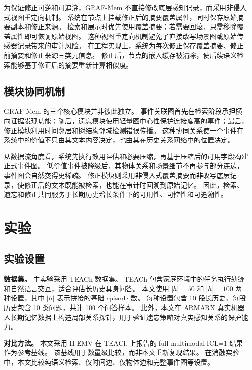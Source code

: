 \documentclass{cjc}
\begin{document}
为保证修正可逆和可追溯，GRAF-Mem 不直接修改底层感知记录，而采用非侵入式视图重定向机制。
系统在节点上挂载修正后的摘要覆盖属性，同时保存原始摘要副本和修正来源。
检索和展示时优先使用覆盖摘要；若需要回滚，只需移除覆盖属性即可恢复原始视图。
这种视图重定向机制避免了直接改写场景图或原始传感器记录带来的审计风险。
在工程实现上，系统为每次修正保存覆盖摘要、修正前摘要和修正来源三类元信息。
修正后，节点的嵌入缓存被清除，使后续语义检索能够基于修正后的摘要重新计算相似度。

\subsection{模块协同机制}

GRAF-Mem 的三个核心模块并非彼此独立。
事件关联图首先在检索阶段承担横向证据发现功能；随后，遗忘模块使用轻量图中心性保护连接度高的事件；最后，修正模块利用时间邻居和树结构邻域检测错误传播。
这种协同关系使一个事件在系统中的价值不只由其文本内容决定，也由其在历史关系网络中的位置决定。

从数据流角度看，系统先执行效用评估和必要压缩，再基于压缩后的可用字段构建正式事件图。
低价值事件被降级后，其物体关系和场景细节不再参与部分连边，事件图会自然变得更稀疏。
修正模块则采用非侵入式覆盖摘要而非改写底层记录，使修正后的文本既能被检索，也能在审计时回溯到原始记忆。
因此，检索、遗忘和修正共同服务于长期历史增长条件下的可用性、可控性和可追溯性。

\section{实验}

\subsection{实验设置}

\textbf{数据集。}
主实验采用 TEACh 数据集\cite{padmakumar2022teach}。
TEACh 包含家庭环境中的任务执行轨迹和自然语言交互，适合评估长历史具身问答。
本文使用 $|h|=50$ 和 $|h|=100$ 两种设置，其中 $|h|$ 表示拼接的基础 episode 数。
每种设置包含 10 段长历史，每段历史包含 10 类问题，共计 100 个问答样本。
此外，本文在 ARMARX 真实机器人长期记忆数据上构造局部关系探针，用于验证遗忘策略对真实感知关系的保护能力\cite{asfour2006armar,vahrenkamp2015armarx}。

\textbf{对比方法。}
本文采用 H-EMV 在 TEACh 上报告的 full multimodal ICL=1 结果作为参考基线。
该基线用于数量级比较，而非本文重新复现结果。
在消融实验中，本文比较纯语义检索、仅时间边、仅物体边和完整事件图等设置。
\end{document}
